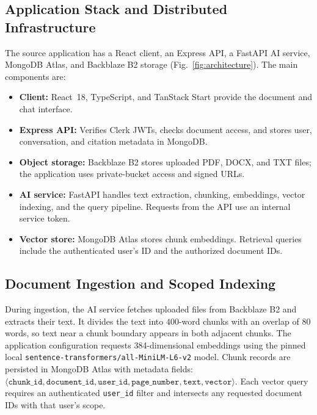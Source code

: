 \documentclass[conference]{IEEEtran}
\begin{document}
\subsection{Application Stack and Distributed Infrastructure}
The source application has a React client, an Express API, a FastAPI AI service,
MongoDB Atlas, and Backblaze B2 storage (Fig.~\ref{fig:architecture}). The main
components are:
\begin{itemize}
  \item \textbf{Client:} React~18, TypeScript, and TanStack Start provide the
    document and chat interface.
  \item \textbf{Express API:} Verifies Clerk JWTs, checks document access, and
    stores user, conversation, and citation metadata in MongoDB.
  \item \textbf{Object storage:} Backblaze B2 stores uploaded PDF, DOCX, and TXT
    files; the application uses private-bucket access and signed URLs.
  \item \textbf{AI service:} FastAPI handles text extraction, chunking,
    embeddings, vector indexing, and the query pipeline. Requests from the API
    use an internal service token.
  \item \textbf{Vector store:} MongoDB Atlas stores chunk embeddings. Retrieval
    queries include the authenticated user's ID and the authorized document IDs.
\end{itemize}

\subsection{Document Ingestion and Scoped Indexing}
During ingestion, the AI service fetches uploaded files from Backblaze B2 and
extracts their text. It divides the text into $400$-word chunks with an overlap
of $80$ words, so text near a chunk boundary appears in both adjacent chunks.
The application configuration requests 384-dimensional embeddings using the
pinned local \texttt{sentence-transformers/all-MiniLM-L6-v2} model.
Chunk records are persisted in MongoDB Atlas with metadata fields:
$\langle\texttt{chunk\_id}, \texttt{document\_id}, \texttt{user\_id},
\texttt{page\_number}, \texttt{text}, \texttt{vector}\rangle$.
Each vector query requires an authenticated \texttt{user\_id} filter and
intersects any requested document IDs with that user's scope.
\end{document}
